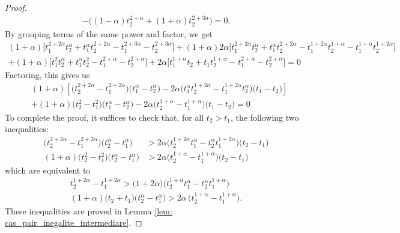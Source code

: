 \documentclass[11pt,reqno,a4paper]{article}%
\theoremstyle{definition}
\theoremstyle{remark}
\begin{document}
\begin{proof}
\begin{multline*}
     - \big( (1 - \alpha)  t_2^{2+\alpha} + (1 + \alpha) t_2^{2+3\alpha} \big) = 0.
\end{multline*}
By grouping terms of the same power and factor, we get
\begin{multline*}
    (1+ \alpha) \Big[  t_1^{2+2\alpha}t_2^{\alpha} + t_1^{\alpha} t_2^{2+2\alpha} - t_1^{2+3\alpha} - t_2^{2+3\alpha} \Big] + (1+ \alpha) 2 \alpha \Big[  t_1^{2+2\alpha}t_2^{\alpha} + t_1^{\alpha} t_2^{2+2\alpha} - t_1^{1 + 2 \alpha} t_2^{1+\alpha} -  t_1^{1+\alpha} t_2^{1+2\alpha} \Big] \\
    + (1 + \alpha) \Big[  t_1^{2}t_2^{\alpha} + t_1^{\alpha} t_2^{2} - t_1^{2+\alpha} - t_2^{2+\alpha} \Big]
    + 2 \alpha \Big[  t_1^{1+\alpha} t_2 + t_1 t_2^{1+\alpha} -t_1^{2+\alpha} - t_2^{2+\alpha} \Big] = 0
\end{multline*}
Factoring, this gives us
\begin{align*}
    &(1+\alpha) \left[\big(  t_2^{2+2\alpha} - t_1^{2+2\alpha} \big) \big( t_1^{\alpha} - t_2^{\alpha} \big) 
    -  2 \alpha \big( t_1^\alpha t_2^{1+2\alpha} - t_1^{1+2\alpha} t_2^{\alpha}  \big) \big( t_1 - t_2 \big)\right] \\
    & + (1+\alpha) \big( t_2^{2} - t_1^{2} \big) \big( t_1^{\alpha} - t_2^{\alpha} \big)
    - 2 \alpha \big( t_2^{1+\alpha} - t_1^{1+\alpha} \big) \big( t_1 - t_2 \big)= 0
\end{align*}
To complete the proof, it suffices to check that, for all $t_2 > t_1$, the following two inequalities:
\begin{align*}
    \big(  t_2^{2+2\alpha} - t_1^{2+2\alpha} \big) \big( t_2^{\alpha} - t_1^{\alpha} \big) &> 2 \alpha \big( t_2^{1+2\alpha} t_1^{\alpha} - t_2^\alpha t_1^{1+2\alpha} \big) \big( t_2 - t_1 \big) \\
    (1+\alpha) \big( t_2^{2} - t_1^{2} \big) \big( t_2^{\alpha} - t_1^{\alpha} \big) &> 2 \alpha \big( t_2^{1+\alpha} - t_1^{1+\alpha} \big) \big( t_2 - t_1 \big)
\end{align*}
which are equivalent to
\begin{align*}
	t_2^{1+2 \alpha} - t_1^{1+2\alpha} > \big( 1+2 \alpha \big) \Big( t_2^{1+\alpha} t_1^\alpha - t_2^\alpha t_1^{1+\alpha} \Big) \\
    (1+\alpha) \big( t_2 + t_1 \big) \big( t_2^{\alpha} - t_1^{\alpha} \big) > 2 \alpha \, \big( t_2^{1+\alpha} - t_1^{1+\alpha} \big).
\end{align*}
These inequalities are proved in Lemma \ref{lem: cas_pair_inegalite_intermediare}.
\end{proof}
\end{document}
